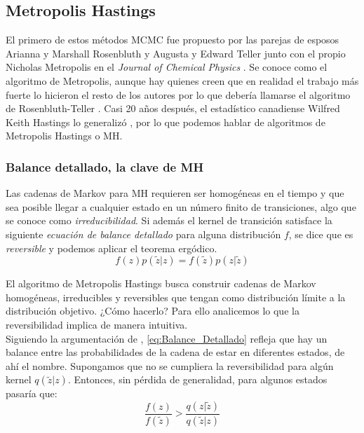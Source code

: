 \subsection{Metropolis Hastings}

 El primero de estos métodos MCMC fue propuesto por las parejas de esposos Arianna y Marshall Rosenbluth y Augusta y Edward Teller junto con el propio Nicholas Metropolis en el \textit{Journal of Chemical Physics} \parencite{Metropolis53}. Se conoce como el algoritmo de Metropolis, aunque hay quienes creen que en realidad el trabajo más fuerte lo hicieron el resto de los autores por lo que debería llamarse el algoritmo de Rosenbluth-Teller \parencite{Gubernatis05}. Casi 20 años después, el estadístico canadiense Wilfred Keith Hastings lo generalizó \parencite{Hastings70}, por lo que podemos hablar de algoritmos de Metropolis Hastings o MH.

\subsubsection*{Balance detallado, la clave de MH}
 
Las cadenas de Markov para MH requieren ser homogéneas en el tiempo y que sea posible llegar a cualquier estado en un número finito de transiciones, algo que se conoce como \textit{irreducibilidad}. Si además el kernel de transición satisface la siguiente \textit{ecuación de balance detallado} para alguna distribución $f$, se dice que es \textit{reversible} y podemos aplicar el teorema ergódico.
\begin{equation}
\label{eq:Balance_Detallado}
f(z)p(\tilde{z}|z)=f(\tilde{z})p(z|\tilde{z})
\end{equation}

El algoritmo de Metropolis Hastings busca construir cadenas de Markov homogéneas, irreducibles y reversibles que tengan como distribución límite a la distribución objetivo. ¿Cómo hacerlo? Para ello analicemos lo que la reversibilidad implica de manera intuitiva.\\

Siguiendo la argumentación de \textcite{ChibGreenberg95}, \eqref{eq:Balance_Detallado} refleja que hay un balance entre las probabilidades de la cadena de estar en diferentes estados, de ahí el nombre. Supongamos que no se cumpliera la reversibilidad para algún kernel $q(\tilde{z}|z)$. Entonces, sin pérdida de generalidad, para algunos estados pasaría que:
\begin{equation}
\label{eq:Inbalance_Detallado}
\dfrac{f(z)}{f(\tilde{z})}>\dfrac{q(z|\tilde{z})}{q(\tilde{z}|z)}
\end{equation}

